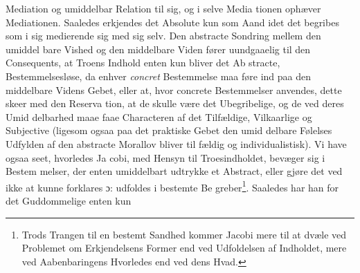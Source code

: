 \documentclass[12pt,a4paper]{book}
\begin{document}
Mediation og umiddelbar Relation til sig, og i selve Media\-%
tionen ophæver Mediationen. Saaledes erkjendes det Absolute
kun som Aand idet det begribes som i sig medierende sig
med sig selv. Den abstracte Sondring mellem den umiddel\-%
bare Vished og den middelbare Viden fører uundgaaelig til
den Consequents, at Troens Indhold enten kun bliver det Ab\-%
stracte, Bestemmelsesløse, da enhver \emph{concret} Bestemmelse
maa føre ind paa den middelbare Videns Gebet, eller at, hvor
concrete Bestemmelser anvendes, dette skeer med den Reserva\-%
tion, at de skulle være det Ubegribelige, og de ved deres Umid\-%
delbarhed maae faae Characteren af det Tilfældige, Vilkaarlige og
Subjective (ligesom ogsaa paa det praktiske Gebet den umid\-%
delbare Følelses Udfylden af den abstracte Morallov bliver til\-%
fældig og individualistisk). Vi have ogsaa seet, hvorledes Ja\-%
cobi, med Hensyn til Troesindholdet, bevæger sig i Bestem\-%
melser, der enten umiddelbart udtrykke et Abstract, eller gjøre
det ved ikke at kunne forklares ɔ: udfoldes i bestemte Be\-%
greber\footnote{Trods Trangen til en bestemt Sandhed kommer Jacobi
  mere til at dvæle ved Problemet om Erkjendelsens Former end ved
  Udfoldelsen af Indholdet, mere ved Aabenbaringens Hvorledes end ved
  dens Hvad.}. Saaledes har han for det Guddommelige enten kun
\end{document}
